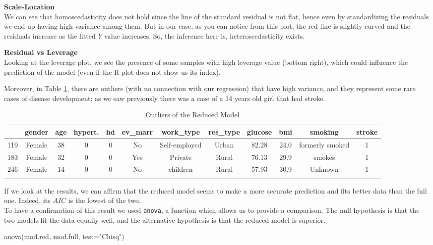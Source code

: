 \documentclass[
]{article}
\newenvironment{Shaded}{\begin{snugshade}}{\end{snugshade}}
\newcommand{\AttributeTok}[1]{\textcolor[rgb]{0.77,0.63,0.00}{#1}}
\newcommand{\FunctionTok}[1]{\textcolor[rgb]{0.00,0.00,0.00}{#1}}
\newcommand{\NormalTok}[1]{#1}
\newcommand{\StringTok}[1]{\textcolor[rgb]{0.31,0.60,0.02}{#1}}
\begin{document}
\textbf{Scale-Location}\\
We can see that homoscedasticity does not hold since the line of the
standard residual is not flat, hence even by standardizing the residuals
we end up having high variance among them. But in our case, as you can
notice from this plot, the red line is slightly curved and the residuals
increase as the fitted \(Y\) value increases. So, the inference here
is, heteroscedasticity exists.

\textbf{Residual vs Leverage}\\
Looking at the leverage plot, we see the presence of some samples with
high leverage value (bottom right), which could influence the prediction
of the model (even if the R-plot does not show us its index).

Moreover, in Table \ref{outliers_reduced}, there are outliers (with no connection with our regression) that have high variance, and they represent some rare cases of disease development; as we saw previously there was a case
of a 14 years old girl that had stroke.

\newpage
\begin{longtable}[]{@{}lccccccccccc@{}}
\toprule
& gender & age & hypert. & hd & ev\_marr & work\_type & res\_type &
glucose & bmi & smoking & stroke \\
\midrule
\endhead
119 & Female & 38 & 0 & 0 & No & Self-employed & Urban & 82.28 & 24.0 &
formerly smoked & 1 \\
183 & Female & 32 & 0 & 0 & Yes & Private & Rural & 76.13 & 29.9 &
smokes & 1 \\
246 & Female & 14 & 0 & 0 & No & children & Rural & 57.93 & 30.9 &
Unknown & 1 \\
\bottomrule
\caption{Outliers of the Reduced Model}\label{outliers_reduced}
\end{longtable}

If we look at the results, we can affirm that the reduced model seems to make a more accurate prediction and fits better data than the full one. Indeed, its \(AIC\)
is the lowest of the two.\\
To have a confirmation of this result we used \texttt{anova}, a function
which allows us to provide a comparison. The null hypothesis is that the
two models fit the data equally well, and the alternative hypothesis is
that the reduced model is superior.

\begin{Shaded}
\begin{Highlighting}[]
\FunctionTok{anova}\NormalTok{(mod.red, mod.full, }\AttributeTok{test=}\StringTok{"Chisq"}\NormalTok{)}
\end{Highlighting}
\end{Shaded}
\end{document}
